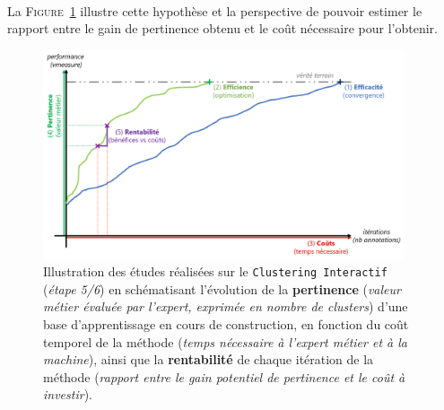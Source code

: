 	\begin{tcolorbox}[
		title=\faVial~\textbf{Hypothèse de rentabilité}~\faVial,
		colback=colorTcolorboxHypothesis!15,
		colframe=colorTcolorboxHypothesis!75,
		width=\linewidth
	]
		 \\
		
		La \textsc{Figure~\ref{figure:4.5-HYPOTHESE-RENTABILITE}} illustre cette hypothèse et la perspective de pouvoir estimer le rapport entre le gain de pertinence obtenu et le coût nécessaire pour l'obtenir.
		\begin{figure}[H]  %
			\centering
			\includegraphics[width=0.95\textwidth]{figures/hypotheses-05-rentabilite}
			\caption{
				Illustration des études réalisées sur le \texttt{Clustering Interactif} (\textit{étape 5/6}) en schématisant l'évolution de la \textbf{pertinence} (\textit{valeur métier évaluée par l'expert, exprimée en nombre de clusters}) d'une base d'apprentissage en cours de construction, en fonction du coût temporel de la méthode (\textit{temps nécessaire à l'expert métier et à la machine}), ainsi que la \textbf{rentabilité} de chaque itération de la méthode (\textit{rapport entre le gain potentiel de pertinence et le coût à investir}).
			}
			\label{figure:4.5-HYPOTHESE-RENTABILITE}
		\end{figure}
	\end{tcolorbox}
		
